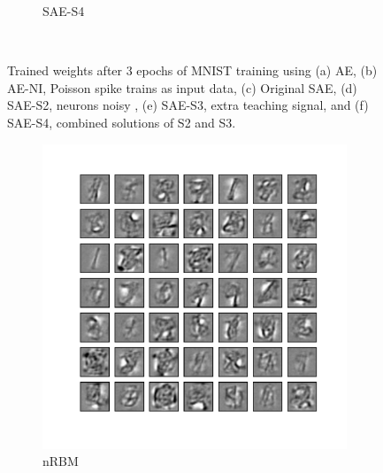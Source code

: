 \begin{figure}
\begin{subfigure}[t]{0.4\textwidth}
		\caption{SAE-S4}
	\end{subfigure}\\
	\caption{Trained weights after 3 epochs of MNIST training using (a) AE, (b) AE-NI, Poisson spike trains as input data, (c) Original SAE, (d) SAE-S2, neurons \DIFdelbeginFL {}\DIFdelendFL \DIFaddbeginFL {}\DIFaddendFL noisy \DIFdelbeginFL {}\DIFdelendFL \DIFaddbeginFL {}\DIFaddendFL , (e) SAE-S3, extra teaching signal, and (f) SAE-S4, combined solutions of S2 and S3.}
	\label{fig:weights_ae}
\end{figure}

\begin{figure}
	\centering
	\begin{subfigure}[t]{0.4\textwidth}
		\includegraphics[width=\textwidth]{pics_sdlm/32_MNIST_RBM/2_60000_0.pdf}
		\caption{nRBM}
	\end{subfigure}
	\begin{subfigure}[t]{0.4\textwidth}

\end{subfigure}
\end{figure}
